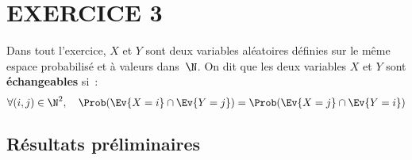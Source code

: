 \documentclass[11pt]{article}%
\begin{document}
\newpage


\section*{EXERCICE 3}

\noindent
Dans tout l'exercice, $X$ et $Y$ sont deux variables aléatoires
définies sur le même espace probabilisé et à valeurs dans~$\N$. On dit
que les deux variables $X$ et $Y$ sont \textbf{échangeables} si~:
\[ 
\forall (i, j) \in \N^2, \quad \Prob(\Ev{X=i} \cap \Ev{Y=j}) = 
\Prob(\Ev{X=j} \cap \Ev{Y=i}) 
\]

\subsection*{Résultats préliminaires}
\end{document}

